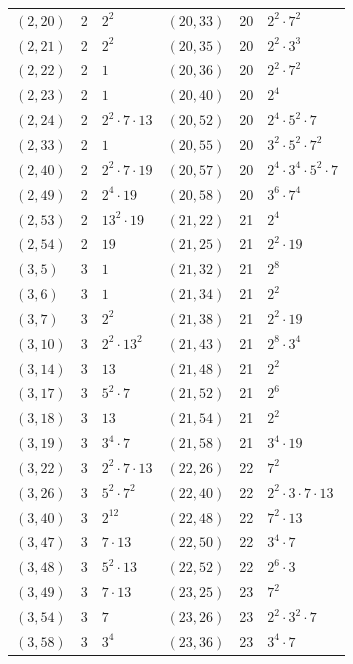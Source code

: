 \documentclass[11pt]{article}
\begin{document}
\begin{longtable}{@{}lrl@{\qquad}lrl@{}}
$(2,20)$ & 2 & $2^{2}$ & $(20,33)$ & 20 & $2^{2}\cdot 7^{2}$\\
$(2,21)$ & 2 & $2^{2}$ & $(20,35)$ & 20 & $2^{2}\cdot 3^{3}$\\
$(2,22)$ & 2 & $1$ & $(20,36)$ & 20 & $2^{2}\cdot 7^{2}$\\
$(2,23)$ & 2 & $1$ & $(20,40)$ & 20 & $2^{4}$\\
$(2,24)$ & 2 & $2^{2}\cdot 7\cdot 13$ & $(20,52)$ & 20 & $2^{4}\cdot 5^{2}\cdot 7$\\
$(2,33)$ & 2 & $1$ & $(20,55)$ & 20 & $3^{2}\cdot 5^{2}\cdot 7^{2}$\\
$(2,40)$ & 2 & $2^{2}\cdot 7\cdot 19$ & $(20,57)$ & 20 & $2^{4}\cdot 3^{4}\cdot 5^{2}\cdot 7$\\
$(2,49)$ & 2 & $2^{4}\cdot 19$ & $(20,58)$ & 20 & $3^{6}\cdot 7^{4}$\\
$(2,53)$ & 2 & $13^{2}\cdot 19$ & $(21,22)$ & 21 & $2^{4}$\\
$(2,54)$ & 2 & $19$ & $(21,25)$ & 21 & $2^{2}\cdot 19$\\
$(3,5)$ & 3 & $1$ & $(21,32)$ & 21 & $2^{8}$\\
$(3,6)$ & 3 & $1$ & $(21,34)$ & 21 & $2^{2}$\\
$(3,7)$ & 3 & $2^{2}$ & $(21,38)$ & 21 & $2^{2}\cdot 19$\\
$(3,10)$ & 3 & $2^{2}\cdot 13^{2}$ & $(21,43)$ & 21 & $2^{8}\cdot 3^{4}$\\
$(3,14)$ & 3 & $13$ & $(21,48)$ & 21 & $2^{2}$\\
$(3,17)$ & 3 & $5^{2}\cdot 7$ & $(21,52)$ & 21 & $2^{6}$\\
$(3,18)$ & 3 & $13$ & $(21,54)$ & 21 & $2^{2}$\\
$(3,19)$ & 3 & $3^{4}\cdot 7$ & $(21,58)$ & 21 & $3^{4}\cdot 19$\\
$(3,22)$ & 3 & $2^{2}\cdot 7\cdot 13$ & $(22,26)$ & 22 & $7^{2}$\\
$(3,26)$ & 3 & $5^{2}\cdot 7^{2}$ & $(22,40)$ & 22 & $2^{2}\cdot 3\cdot 7\cdot 13$\\
$(3,40)$ & 3 & $2^{12}$ & $(22,48)$ & 22 & $7^{2}\cdot 13$\\
$(3,47)$ & 3 & $7\cdot 13$ & $(22,50)$ & 22 & $3^{4}\cdot 7$\\
$(3,48)$ & 3 & $5^{2}\cdot 13$ & $(22,52)$ & 22 & $2^{6}\cdot 3$\\
$(3,49)$ & 3 & $7\cdot 13$ & $(23,25)$ & 23 & $7^{2}$\\
$(3,54)$ & 3 & $7$ & $(23,26)$ & 23 & $2^{2}\cdot 3^{2}\cdot 7$\\
$(3,58)$ & 3 & $3^{4}$ & $(23,36)$ & 23 & $3^{4}\cdot 7$\\

\end{longtable}
\end{document}
